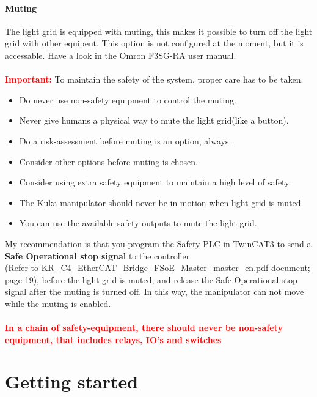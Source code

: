 \documentclass{article}
\begin{document}
        \paragraph{Muting}
        The light grid is equipped with muting, this makes it possible to turn off the light grid with other equipent. This option is not configured at the moment, but it is accessable. Have a look in the Omron F3SG-RA user manual. 
        \\\\
        \textbf{\textcolor{red}{Important:}} To maintain the safety of the system, proper care has to be taken. 
        \begin{itemize}
            \item  Do never use non-safety equipment to control the muting.
            \item Never give humans a physical way to mute the light grid(like a button).
            \item Do a risk-assessment before muting is an option, always. 
            \item Consider other options before muting is chosen.
            \item Consider using extra safety equipment to maintain a high level of safety.
            \item The Kuka manipulator should never be in motion when light grid is muted.
            \item You can use the available safety outputs to mute the light grid.
        \end{itemize}

        My recommendation is that you program the Safety PLC in TwinCAT3 to send a \textbf{Safe Operational stop signal} to the controller
        \\
        (Refer to KR\_C4\_EtherCAT\_Bridge\_FSoE\_Master\_master\_en.pdf document; page 19), before the light grid is muted, and release the Safe Operational stop signal after the muting is turned off. In this way, the manipulator can not move while the muting is enabled. 
        \\\\
        \textbf{\textcolor{red}{In a chain of safety-equipment, there should never be non-safety equipment, that includes relays, IO's and switches}}
        
        \newpage 
        
\section{Getting started}
\end{document}
